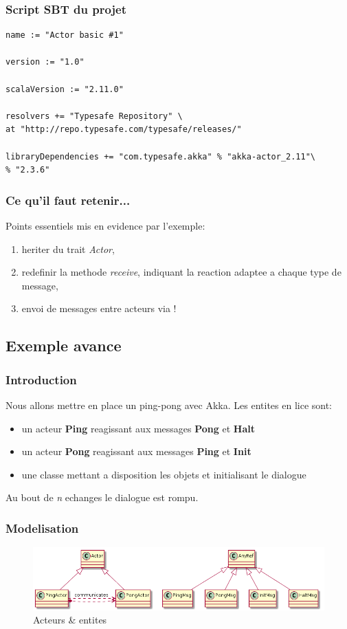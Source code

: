 \documentclass[xcolor=dvipsnames]{beamer}
\begin{document}
\begin{frame}[fragile]
  \frametitle{Script SBT du projet}
    \lstset{frameround=fttt}
\begin{lstlisting}[frame=trBL]
name := "Actor basic #1"

version := "1.0"

scalaVersion := "2.11.0"

resolvers += "Typesafe Repository" \
at "http://repo.typesafe.com/typesafe/releases/"

libraryDependencies += "com.typesafe.akka" % "akka-actor_2.11"\
% "2.3.6"
\end{lstlisting}
\end{frame}

\begin{frame}
  \frametitle{Ce qu'il faut retenir...}
  Points essentiels mis en evidence par l'exemple:
  \begin{enumerate}
  \item heriter du trait \textit{Actor},
  \item redefinir la methode \textit{receive}, indiquant la reaction adaptee a chaque type de message,
  \item envoi de messages entre acteurs via !
  \end{enumerate}
\end{frame}

\subsection{Exemple avance}
\begin{frame}
  \frametitle{Introduction}
  Nous allons mettre en place un ping-pong avec Akka.
  Les entites en lice sont:
  \begin{itemize}
  \item un acteur \textbf{Ping} reagissant aux messages \textbf{Pong} et \textbf{Halt}
  \item un acteur \textbf{Pong} reagissant aux messages \textbf{Ping} et \textbf{Init}
  \item une classe mettant a disposition les objets et initialisant le dialogue
  \end{itemize}
  Au bout de \textit{n} echanges le dialogue est rompu.
\end{frame}

\begin{frame}[fragile]
  \frametitle{Modelisation}
   \begin{figure}[h!]
  \caption{Acteurs \& entites}
  \centering
      \includegraphics[scale=0.25]{pingpong-classes}
   \end{figure}
\end{frame}
\end{document}
